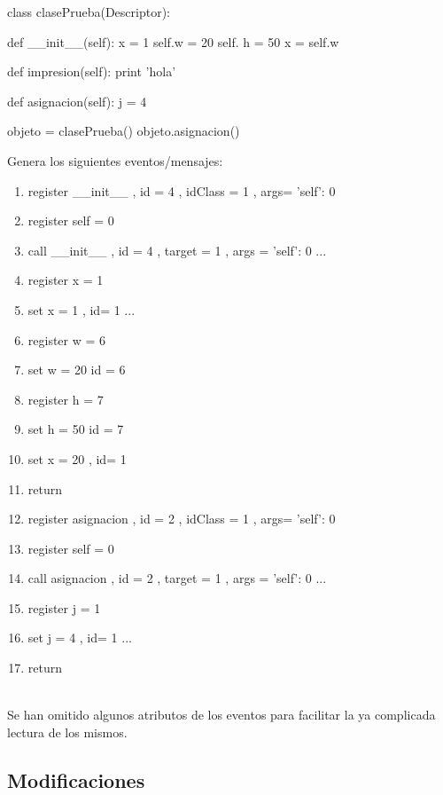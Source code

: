 \documentclass[10pt,a4paper]{article}
\begin{document}
\begin{minipage}{5.5cm}
\begin{boxedverbatim}
class clasePrueba(Descriptor):

    def __init__(self):
        x = 1
        self.w = 20
        self. h = 50
        x = self.w

    def impresion(self):
        print 'hola'

    def asignacion(self):
        j = 4

objeto = clasePrueba()
objeto.asignacion()
\end{boxedverbatim}
\end{minipage}
\begin{minipage}{5.5cm}
Genera los siguientes eventos/mensajes:

\begin{enumerate}
\item register \_\_init\_\_ , id = 4 , idClass =  1 , args= {'self': 0}
\item register self = 0
\item call \_\_init\_\_ , id = 4 , target = 1 , args = {'self': 0} ...
\item register x = 1
\item set x = 1 , id= 1 ...
\item register w = 6
\item set w = 20 id = 6
\item register h = 7
\item set h = 50 id = 7
\item set x = 20 , id= 1
\item return
\item register asignacion , id = 2 , idClass =  1 , args= {'self': 0}
\item register self = 0
\item call asignacion , id = 2 , target = 1 , args = {'self': 0} ...
\item register j = 1
\item set j = 4 , id= 1 ...
\item return\\
\end{enumerate}
\end{minipage}
\\

Se han omitido algunos atributos de los eventos para facilitar la ya complicada lectura de los mismos.

\subsection{Modificaciones}
\end{document}
